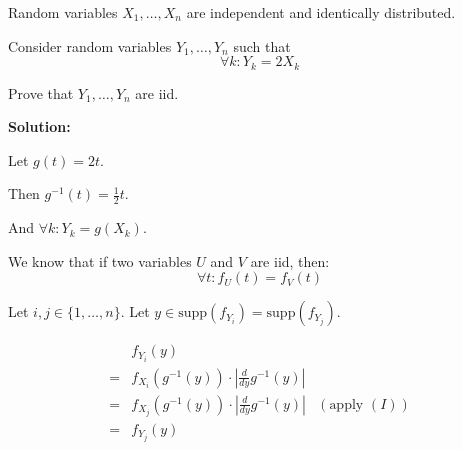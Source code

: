\documentclass{article}
\begin{document}
Random variables \(X_1,\ldots,X_n\) are independent and identically distributed.

Consider random variables \(Y_1,\ldots, Y_n\) such that
\[\forall k:Y_k=2X_k\]

Prove that \(Y_1,\ldots,Y_n\) are iid.

\textbf{Solution:}

Let \(g(t) = 2t\).

Then \(g^{-1}(t) = \frac12 t\).

And \(\forall k: Y_k=g(X_k)\).

We know that if two variables \(U\) and \(V\) are iid, then:
\[\forall t: f_U(t) = f_V(t) \tag{1}\]

Let \(i,j\in \{1,\ldots,n\}\). Let \(y\in \text{supp}(f_{Y_i})=\text{supp}(f_{Y_j})\).

\begin{align*}
     & f_{Y_i}(y) \\
    =& f_{X_i}(g^{-1}(y)) \cdot \left|\frac{d}{dy} g^{-1}(y)\right| \\
    =& f_{X_j}(g^{-1}(y)) \cdot \left|\frac{d}{dy} g^{-1}(y)\right| & (\text{apply } (I)) \\
    =& f_{Y_j}(y)
\end{align*}
\end{document}
